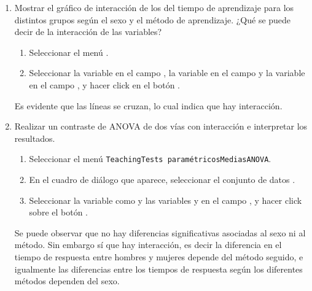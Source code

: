 \begin{enumerate}[leftmargin=*]
\begin{enumerate}
\item Mostrar el gráfico de interacción de los del tiempo de aprendizaje para los distintos grupos según el sexo y el método
de aprendizaje. 
¿Qué se puede decir de la interacción de las variables?
\begin{indicacion}{
\begin{enumerate}
\item Seleccionar el menú .
\item Seleccionar la variable  en el campo , la variable
 en el campo  y la variable  en el campo , y hacer click en el botón .
\end{enumerate}
Es evidente que las líneas se cruzan, lo cual indica que hay interacción.
}
\end{indicacion}

\item Realizar un contraste de ANOVA de dos vías con interacción e interpretar los resultados.
\begin{indicacion}{
\begin{enumerate}
\item Seleccionar el menú \texttt{Teaching\flecha Tests paramétricos\flecha Medias\flecha ANOVA}.
\item En el cuadro de diálogo que aparece, seleccionar el conjunto de datos .
\item Seleccionar la variable  como  y las variables
 y  en el campo , y hacer click sobre el botón
.
\end{enumerate}
Se puede observar que no hay diferencias significativas asociadas al sexo ni al método. 
Sin embargo sí que hay interacción, es decir la diferencia en el tiempo de respuesta entre hombres y mujeres depende del
método seguido, e igualmente las diferencias entre los tiempos de respuesta según los diferentes métodos dependen del
sexo.
}
\end{indicacion}


\end{enumerate}
\end{enumerate}
